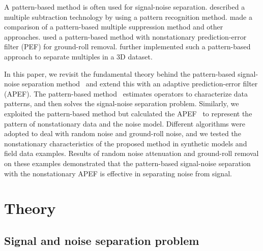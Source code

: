 A pattern-based method is often used for signal-noise separation. \cite{Spitz99}
described a multiple subtraction technology by using a pattern recognition method.
\cite{Bednar99} made a comparison of a pattern-based multiple suppression method
and other approaches. \cite{Brown00} used a pattern-based method with nonstationary
prediction-error filter (PEF) for ground-roll removal. \cite{Guitton06} further
implemented such a pattern-based approach to separate multiples in a 3D dataset.

In this paper, we revisit the fundamental theory behind the pattern-based signal-noise
separation method~\cite[]{Claerbout10} and extend this with an adaptive prediction-error
filter (APEF). The pattern-based method~\cite[]{Brown00,Claerbout00} estimates operators
to characterize data patterns, and then solves the signal-noise separation problem.
Similarly, we exploited the pattern-based method but calculated the APEF~\cite[]{Liu11}
to represent the pattern of nonstationary data and the noise model. Different algorithms
were adopted to deal with random noise and ground-roll noise, and we tested the
nonstationary characteristics of the proposed method in synthetic models and field data
examples. Results of random noise attenuation and ground-roll removal on these examples
demonstrated that the pattern-based signal-noise separation with the nonstationary APEF
is effective in separating noise from signal.

\section{Theory}
\subsection{Signal and noise separation problem}

